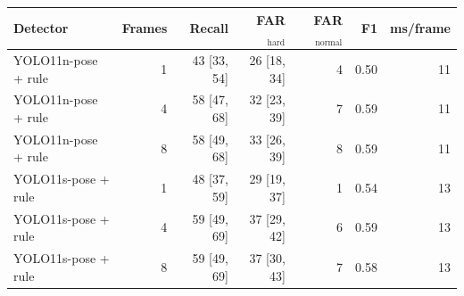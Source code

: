 \begin{tabular}{lrrrrrr}
\toprule
Detector & Frames & Recall & FAR$_\text{hard}$ & FAR$_\text{normal}$ & F1 & ms/frame \\
\midrule
YOLO11n-pose + rule & 1 & 43 \scriptsize[33, 54] & 26 \scriptsize[18, 34] & 4 & 0.50 & 11 \\
YOLO11n-pose + rule & 4 & 58 \scriptsize[47, 68] & 32 \scriptsize[23, 39] & 7 & 0.59 & 11 \\
YOLO11n-pose + rule & 8 & 58 \scriptsize[49, 68] & 33 \scriptsize[26, 39] & 8 & 0.59 & 11 \\
YOLO11s-pose + rule & 1 & 48 \scriptsize[37, 59] & 29 \scriptsize[19, 37] & 1 & 0.54 & 13 \\
YOLO11s-pose + rule & 4 & 59 \scriptsize[49, 69] & 37 \scriptsize[29, 42] & 6 & 0.59 & 13 \\
YOLO11s-pose + rule & 8 & 59 \scriptsize[49, 69] & 37 \scriptsize[30, 43] & 7 & 0.58 & 13 \\
\bottomrule
\end{tabular}
